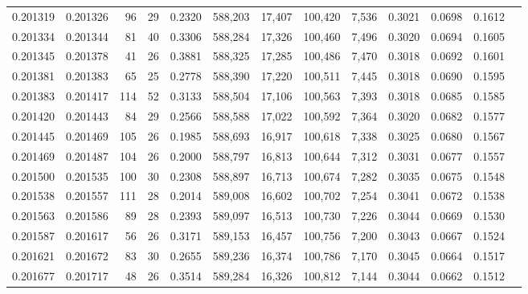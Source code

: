 \begin{tabular}{rrrrrrrrrrrrr}
0.201319 & 0.201326 &    96 &  29 &                                     0.2320 & 588,203 &  17,407 & 100,420 &   7,536 & 0.3021 & 0.0698 & 0.1612 \\
0.201334 & 0.201344 &    81 &  40 &                                     0.3306 & 588,284 &  17,326 & 100,460 &   7,496 & 0.3020 & 0.0694 & 0.1605 \\
0.201345 & 0.201378 &    41 &  26 &                                     0.3881 & 588,325 &  17,285 & 100,486 &   7,470 & 0.3018 & 0.0692 & 0.1601 \\
0.201381 & 0.201383 &    65 &  25 &                                     0.2778 & 588,390 &  17,220 & 100,511 &   7,445 & 0.3018 & 0.0690 & 0.1595 \\
0.201383 & 0.201417 &   114 &  52 &                                     0.3133 & 588,504 &  17,106 & 100,563 &   7,393 & 0.3018 & 0.0685 & 0.1585 \\
0.201420 & 0.201443 &    84 &  29 &                                     0.2566 & 588,588 &  17,022 & 100,592 &   7,364 & 0.3020 & 0.0682 & 0.1577 \\
0.201445 & 0.201469 &   105 &  26 &                                     0.1985 & 588,693 &  16,917 & 100,618 &   7,338 & 0.3025 & 0.0680 & 0.1567 \\
0.201469 & 0.201487 &   104 &  26 &                                     0.2000 & 588,797 &  16,813 & 100,644 &   7,312 & 0.3031 & 0.0677 & 0.1557 \\
0.201500 & 0.201535 &   100 &  30 &                                     0.2308 & 588,897 &  16,713 & 100,674 &   7,282 & 0.3035 & 0.0675 & 0.1548 \\
0.201538 & 0.201557 &   111 &  28 &                                     0.2014 & 589,008 &  16,602 & 100,702 &   7,254 & 0.3041 & 0.0672 & 0.1538 \\
0.201563 & 0.201586 &    89 &  28 &                                     0.2393 & 589,097 &  16,513 & 100,730 &   7,226 & 0.3044 & 0.0669 & 0.1530 \\
0.201587 & 0.201617 &    56 &  26 &                                     0.3171 & 589,153 &  16,457 & 100,756 &   7,200 & 0.3043 & 0.0667 & 0.1524 \\
0.201621 & 0.201672 &    83 &  30 &                                     0.2655 & 589,236 &  16,374 & 100,786 &   7,170 & 0.3045 & 0.0664 & 0.1517 \\
0.201677 & 0.201717 &    48 &  26 &                                     0.3514 & 589,284 &  16,326 & 100,812 &   7,144 & 0.3044 & 0.0662 & 0.1512 \\

\end{tabular}
